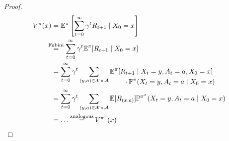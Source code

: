 \begin{proof}
	\begin{align*}
		V^\pi(x)
		&=\E^\pi\left[\sum_{t=0}^\infty \gamma^t R_{t+1} \mid X_0=x \right]\\
		&\lxeq{\text{Fubini}} \sum_{t=0}^\infty \gamma^t \E^\pi[R_{t+1}\mid X_0=x]\\
		&=\sum_{t=0}^\infty \gamma^t \sum_{(y,a)\in\cX\times\cA}
		\begin{aligned}[t]
		&\E^\pi[R_{t+1}\mid X_t=y, A_t=a, X_0=x]\\
		&\qquad\cdot\Pr^\pi(X_t=y,A_t=a\mid X_0=x)
		\end{aligned}\\
		&=\sum_{t=0}^\infty \gamma^t \sum_{(y,a)\in\cX\times\cA}\E[R_{(x,a)}]
		\Pr^{\pi^x}(X_t=y,A_t=a\mid X_0=x)\\
		&=\dots \xeq{\text{analogous}} V^{\pi^x}(x)\qedhere
	\end{align*}
\end{proof}

